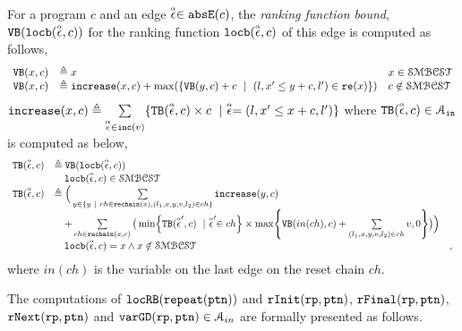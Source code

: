   \begin{defn}
    \label{def:ranking_bound}
  For a program $c$ and an edge $\stackrel{\scriptscriptstyle{\alpha}}{\mathtt{\epsilon}{}} \in \mathtt{abs}{\mathtt{E}}(c)$,
  the \emph{ranking function bound}, ${\mathtt{VB}}(\mathtt{locb}(\stackrel{\scriptscriptstyle{\alpha}}{\mathtt{\epsilon}{}}, c))$ for the ranking function $\mathtt{locb}(\stackrel{\scriptscriptstyle{\alpha}}{\mathtt{\epsilon}{}}, c)$
  of this edge
  is computed as follows,
    \[ 
  \begin{array}{lll}
    {\ensuremath{\mathtt{VB}}}(x, c) & \triangleq x & x \in \mathcal{SMBCST} \\
    {\mathtt{VB}}(x, c) & \triangleq \mathtt{increase}(x, c) + \max(\{{\mathtt{VB}}(y, c) + c ~\mid~ (l, x' \leq y + c, l') \in \mathtt{re}(x)\}) & c \notin \mathcal{SMBCST}
  \end{array}
  \]
  $\mathtt{increase}(x, c) \triangleq \sum\limits_{\stackrel{\scriptscriptstyle{\alpha}}{\mathtt{\epsilon}{}} \in \mathtt{inc}(v)}\{{\mathtt{TB}}(\stackrel{\scriptscriptstyle{\alpha}}{\mathtt{\epsilon}{}}, c) \times c ~\mid~ \stackrel{\scriptscriptstyle{\alpha}}{\mathtt{\epsilon}{}} = (l, x' \leq x + c, l')\}$ where 
  ${\mathtt{TB}}(\stackrel{\scriptscriptstyle{\alpha}}{\mathtt{\epsilon}{}}, c) \in \mathcal{A}_{\mathtt{in}}$  is computed as below,
\[ 
\begin{array}{lll}
  \absclr(\absevent, c) 
  & \triangleq \varinvar(\locbound(\absevent, c))  & \\
  & \quad \locbound(\absevent, c) \in \constdom & \\
  \absclr(\absevent, c) 
  & \triangleq \Big(
    \sum\limits_{y \in \{ y ~|~ 
    ch \in \resetchain(x), (l_1, x, y, v, l_2) \in ch \} } \incrs(y, c) & \\
    & \quad + 
  \sum\limits_{ch \in \resetchain(x, c)}
  \big( \min\left\{\absclr(\absevent', c) ~\mid~ \absevent' \in ch\right\} \times 
  \max\left\{\varinvar(in(ch), c) + \sum\limits_{(l_1, x, y, v, l_2) \in ch } v, 0 \right\}\big) \Big)  & \\
  &  \quad \locbound(\absevent, c) = x \land x \notin \constdom & ,
\end{array}
  \]
 where $in(ch)$ is the variable on the last edge on the reset chain $ch$.
\end{defn}
The computations of $\mathtt{locRB}(\mathtt{repeat}({\mathtt{ptn}}))$ and $\mathtt{rInit}(\mathtt{rp}, \mathtt{ptn})$,
$\mathtt{rFinal}(\mathtt{rp}, \mathtt{ptn})$, $\mathtt{rNext}(\mathtt{rp}, \mathtt{ptn})$ and $\mathtt{varGD}(\mathtt{rp}, \mathtt{ptn}) \in \mathcal{A}_{in}$
are formally presented as follows.
